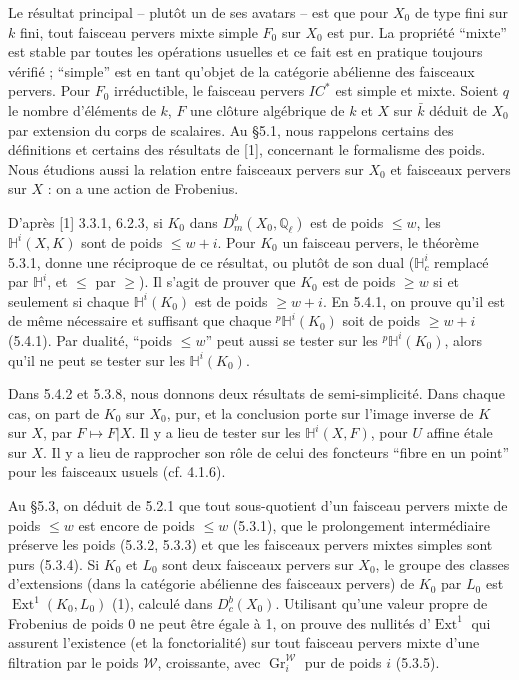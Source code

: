 \documentclass[12pt,a4paper]{article}
\theoremstyle{plain}
\theoremstyle{definition}
\theoremstyle{remark}
\DeclareMathOperator{\Ext}{Ext}
\DeclareMathOperator{\Gr}{Gr}
\newcommand{\HH}{\mathbb{H}}
\newcommand{\IC}{\mathit{IC}}
\newcommand{\QQ}{\mathbb{Q}}
\begin{document}
Le résultat principal -- plutôt un de ses avatars -- est que pour $X_{0}$ de type fini sur $k$ fini, tout faisceau pervers mixte simple $F_{0}$ sur $X_{0}$ est pur. La propriété ``mixte'' est stable par toutes les opérations usuelles et ce fait est en pratique toujours vérifié ; ``simple'' est en tant qu'objet de la catégorie abélienne des faisceaux pervers. Pour $F_{0}$ irréductible, le faisceau pervers $\IC^{*}$ est simple et mixte. Soient $q$ le nombre d'éléments de $k$, $F$ une clôture algébrique de $k$ et $X$ sur $\bar{k}$ déduit de $X_{0}$ par extension du corps de scalaires. Au §5.1, nous rappelons certains des définitions et certains des résultats de [1], concernant le formalisme des poids. Nous étudions aussi la relation entre faisceaux pervers sur $X_{0}$ et faisceaux pervers sur $X$ : on a une action de Frobenius.

D'après [1] 3.3.1, 6.2.3, si $K_{0}$ dans $D^{b}_{m}(X_{0}, \QQ_{\ell})$ est de poids $\leq w$, les $\HH^{i}(X, K)$ sont de poids $\leq w{+}i$. Pour $K_{0}$ un faisceau pervers, le théorème 5.3.1, donne une réciproque de ce résultat, ou plutôt de son dual ($\HH^{i}_{c}$ remplacé par $\HH^{i}$, et $\leq$ par $\geq$). Il s'agit de prouver que $K_{0}$ est de poids $\geq w$ si et seulement si chaque $\HH^{i}(K_{0})$ est de poids $\geq w{+}i$. En 5.4.1, on prouve qu'il est de même nécessaire et suffisant que chaque ${}^{p}\HH^{i}(K_{0})$ soit de poids $\geq w{+}i$ (5.4.1). Par dualité, ``poids $\leq w$'' peut aussi se tester sur les ${}^{p}\HH^{i}(K_{0})$, alors qu'il ne peut se tester sur les $\HH^{i}(K_{0})$.

Dans 5.4.2 et 5.3.8, nous donnons deux résultats de semi-simplicité. Dans chaque cas, on part de $K_{0}$ sur $X_{0}$, pur, et la conclusion porte sur l'image inverse de $K$ sur $X$, par $F \mapsto F|X$. Il y a lieu de tester sur les $\HH^{i}(X, F)$, pour $U$ affine étale sur $X$. Il y a lieu de rapprocher son rôle de celui des foncteurs ``fibre en un point'' pour les faisceaux usuels (cf. 4.1.6).

Au §5.3, on déduit de 5.2.1 que tout sous-quotient d'un faisceau pervers mixte de poids $\leq w$ est encore de poids $\leq w$ (5.3.1), que le prolongement intermédiaire préserve les poids (5.3.2, 5.3.3) et que les faisceaux pervers mixtes simples sont purs (5.3.4). Si $K_{0}$ et $L_{0}$ sont deux faisceaux pervers sur $X_{0}$, le groupe des classes d'extensions (dans la catégorie abélienne des faisceaux pervers) de $K_{0}$ par $L_{0}$ est $\Ext^{1}(K_{0}, L_{0})$ (1), calculé dans $D^{b}_{c}(X_{0})$. Utilisant qu'une valeur propre de Frobenius de poids $0$ ne peut être égale à 1, on prouve des nullités d'$\Ext^{1}$ qui assurent l'existence (et la fonctorialité) sur tout faisceau pervers mixte d'une filtration par le poids $\mathcal{W}$, croissante, avec $\Gr^{\mathcal{W}}_{i}$ pur de poids $i$ (5.3.5).
\end{document}
